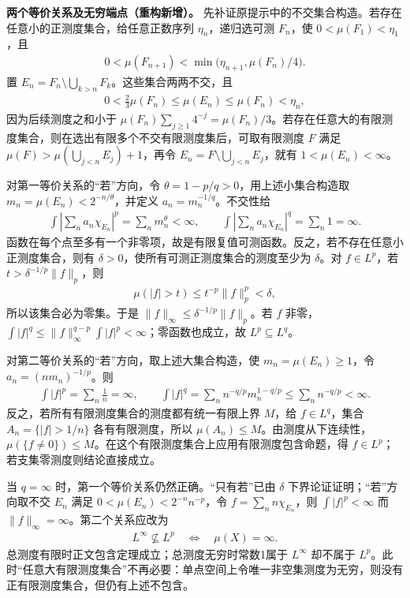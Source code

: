 \documentclass[../../main.tex]{subfiles}
\begin{document}
\begin{solution}
\textbf{两个等价关系及无穷端点（重构新增）。}
先补证原提示中的不交集合构造。若存在任意小的正测度集合，给任意正数序列 $\eta_n$，递归选可测 $F_n$，使 $0<\mu(F_1)<\eta_1$，且
\begin{align*}
0<\mu(F_{n+1})<\min\bigl(\eta_{n+1},\mu(F_n)/4\bigr).
\end{align*}
置 $E_n=F_n\setminus\bigcup_{k>n}F_k$。这些集合两两不交，且
\begin{align*}
0<\tfrac23\mu(F_n)\leqslant\mu(E_n)\leqslant\mu(F_n)<\eta_n,
\end{align*}
因为后续测度之和小于 $\mu(F_n)\sum_{j\geqslant1}4^{-j}=\mu(F_n)/3$。若存在任意大的有限测度集合，则在选出有限多个不交有限测度集后，可取有限测度 $F$ 满足 $\mu(F)>\mu(\bigcup_{j<n}E_j)+1$，再令 $E_n=F\setminus\bigcup_{j<n}E_j$，就有 $1<\mu(E_n)<\infty$。

对第一等价关系的“若”方向，令 $\theta=1-p/q>0$，用上述小集合构造取 $m_n=\mu(E_n)<2^{-n/\theta}$，并定义 $a_n=m_n^{-1/q}$。不交性给
\begin{align*}
\int\left|\sum_na_n\chi_{E_n}\right|^p=\sum_nm_n^\theta<\infty,
\qquad
\int\left|\sum_na_n\chi_{E_n}\right|^q=\sum_n1=\infty.
\end{align*}
函数在每个点至多有一个非零项，故是有限复值可测函数。反之，若不存在任意小正测度集合，则有 $\delta>0$，使所有可测正测度集合的测度至少为 $\delta$。对 $f\in L^p$，若 $t>\delta^{-1/p}\|f\|_p$，则
\begin{align*}
\mu(|f|>t)\leqslant t^{-p}\|f\|_p^p<\delta,
\end{align*}
所以该集合必为零集。于是 $\|f\|_\infty\leqslant\delta^{-1/p}\|f\|_p$。若 $f$ 非零，$\int|f|^q\leqslant\|f\|_\infty^{q-p}\int|f|^p<\infty$；零函数也成立，故 $L^p\subseteq L^q$。

对第二等价关系的“若”方向，取上述大集合构造，使 $m_n=\mu(E_n)\geqslant1$，令 $a_n=(nm_n)^{-1/p}$。则
\begin{align*}
\int|f|^p=\sum_n\frac1n=\infty,
\qquad
\int|f|^q=\sum_nn^{-q/p}m_n^{1-q/p}
\leqslant\sum_nn^{-q/p}<\infty.
\end{align*}
反之，若所有有限测度集合的测度都有统一有限上界 $M$，给 $f\in L^q$，集合 $A_n=\{|f|>1/n\}$ 各有有限测度，所以 $\mu(A_n)\leqslant M$。由测度从下连续性，$\mu(\{f\ne0\})\leqslant M$。在这个有限测度集合上应用有限测度包含命题，得 $f\in L^p$；若支集零测度则结论直接成立。

当 $q=\infty$ 时，第一个等价关系仍然正确。“只有若”已由 $\delta$ 下界论证证明；“若”方向取不交 $E_n$ 满足 $0<\mu(E_n)<2^{-n}n^{-p}$，令 $f=\sum_nn\chi_{E_n}$，则 $\int|f|^p<\infty$ 而 $\|f\|_\infty=\infty$。第二个关系应改为
\begin{align*}
L^\infty\not\subseteq L^p\quad\Longleftrightarrow\quad\mu(X)=\infty.
\end{align*}
总测度有限时正文包含定理成立；总测度无穷时常数1属于 $L^\infty$ 却不属于 $L^p$。此时“任意大有限测度集合”不再必要：单点空间上令唯一非空集测度为无穷，则没有正有限测度集合，但仍有上述不包含。
\end{solution}
\end{document}

